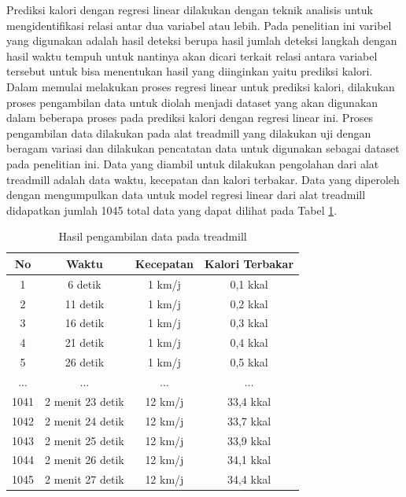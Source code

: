Prediksi kalori dengan regresi linear dilakukan dengan teknik analisis untuk mengidentifikasi relasi antar dua variabel atau lebih. Pada penelitian ini varibel yang digunakan adalah hasil deteksi berupa hasil jumlah deteksi langkah dengan hasil waktu tempuh untuk nantinya akan dicari terkait relasi antara variabel tersebut untuk bisa menentukan hasil yang diinginkan yaitu prediksi kalori. Dalam memulai melakukan proses regresi linear untuk prediksi kalori, dilakukan proses pengambilan data untuk diolah menjadi dataset yang akan digunakan dalam beberapa proses pada prediksi kalori dengan regresi linear ini. Proses pengambilan data dilakukan pada alat treadmill yang dilakukan uji dengan beragam variasi dan dilakukan pencatatan data untuk digunakan sebagai dataset pada penelitian ini. Data yang diambil untuk dilakukan pengolahan dari alat treadmill adalah data waktu, kecepatan dan kalori terbakar. Data yang diperoleh dengan mengumpulkan data untuk model regresi linear dari alat treadmill didapatkan jumlah 1045 total data yang dapat dilihat pada Tabel \ref{tb:DatasetRegresi}.

\begin{longtable}{|c|c|c|c|}
  \caption{Hasil pengambilan data pada treadmill}
  \label{tb:DatasetRegresi}                                   \\
  \hline
  \rowcolor[HTML]{C0C0C0}
  \textbf{No} & \textbf{Waktu} & \textbf{Kecepatan} & \textbf{Kalori Terbakar} \\
  \hline
  1   & 6 detik   & 1 km/j    & 0,1 kkal    \\
  \hline
  2   & 11 detik   & 1 km/j    & 0,2 kkal    \\
  \hline
  3   & 16 detik   & 1 km/j    & 0,3 kkal    \\
  \hline
  4   & 21 detik   & 1 km/j    & 0,4 kkal    \\
  \hline
  5   & 26 detik   & 1 km/j    & 0,5 kkal    \\
  \hline
  ...   & ...      & ...    & ...    \\
  \hline
  1041   & 2 menit 23 detik    & 12 km/j    & 33,4 kkal    \\
  \hline
  1042   & 2 menit 24 detik    & 12 km/j    & 33,7 kkal    \\
  \hline
  1043   & 2 menit 25 detik    & 12 km/j    & 33,9 kkal    \\
  \hline
  1044   & 2 menit 26 detik    & 12 km/j    & 34,1 kkal    \\
  \hline
  1045   & 2 menit 27 detik    & 12 km/j    & 34,4 kkal    \\
  \hline
\end{longtable}

